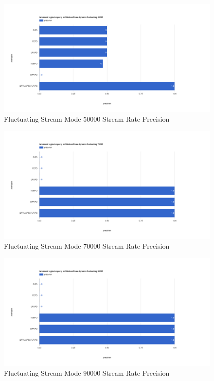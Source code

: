 \begin{figure}[!htbp]
    \centering
    \includegraphics[width=\textwidth]{img/app3-f-50000-p.png}
    \caption{Fluctuating Stream Mode 50000 Stream Rate Precision}
\end{figure}
\begin{figure}[!htbp]
    \centering
    \includegraphics[width=\textwidth]{img/app3-f-70000-p.png}
    \caption{Fluctuating Stream Mode 70000 Stream Rate Precision}
\end{figure}
\begin{figure}[!htbp]
    \centering
    \includegraphics[width=\textwidth]{img/app3-f-90000-p.png}
    \caption{Fluctuating Stream Mode 90000 Stream Rate Precision}
\end{figure}
